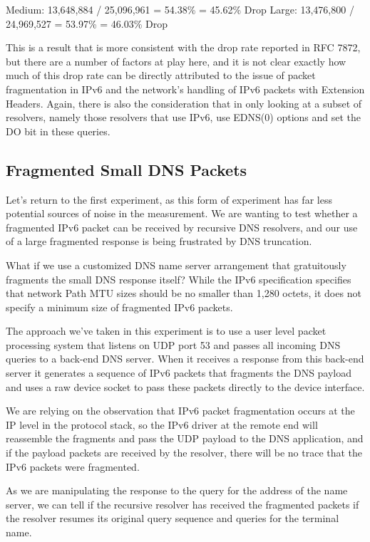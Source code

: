 Medium: 13,648,884 / 25,096,961 = 54.38\% = 45.62\% Drop 
Large:  13,476,800 / 24,969,527 = 53.97\% = 46.03\% Drop

This is a result that is more consistent with the drop rate reported in RFC 7872, but there are a number of factors at play here, and it is not clear exactly how much of this drop rate can be directly attributed to the issue of packet fragmentation in IPv6 and the network’s handling of IPv6 packets with Extension Headers. Again, there is also the consideration that in only looking at a subset of resolvers, namely those resolvers that use IPv6, use EDNS(0) options and set the DO bit in these queries.

\subsection{Fragmented Small DNS Packets}

Let’s return to the first experiment, as this form of experiment has far less potential sources of noise in the measurement. We are wanting to test whether a fragmented IPv6 packet can be received by recursive DNS resolvers, and our use of a large fragmented response is being frustrated by DNS truncation.

What if we use a customized DNS name server arrangement that gratuitously fragments the small DNS response itself? While the IPv6 specification specifies that network Path MTU sizes should be no smaller than 1,280 octets, it does not specify a minimum size of fragmented IPv6 packets.

The approach we’ve taken in this experiment is to use a user level packet processing system that listens on UDP port 53 and passes all incoming DNS queries to a back-end DNS server. When it receives a response from this back-end server it generates a sequence of IPv6 packets that fragments the DNS payload and uses a raw device socket to pass these packets directly to the device interface.

We are relying on the observation that IPv6 packet fragmentation occurs at the IP level in the protocol stack, so the IPv6 driver at the remote end will reassemble the fragments and pass the UDP payload to the DNS application, and if the payload packets are received by the resolver, there will be no trace that the IPv6 packets were fragmented.

As we are manipulating the response to the query for the address of the name server, we can tell if the recursive resolver has received the fragmented packets if the resolver resumes its original query sequence and queries for the terminal name.

